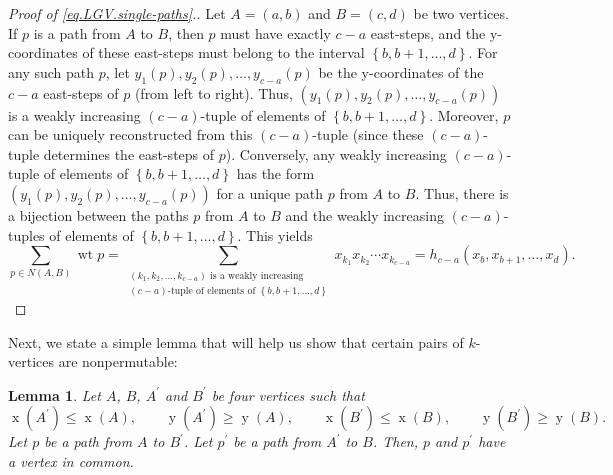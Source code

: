 \documentclass[reqno]{amsart}%
\newcommand{\0}{\phantom{c}}
\let\sumnonlimits\sum
\renewcommand{\sum}{\sumnonlimits\limits}
\theoremstyle{plain}
\newtheorem{lemma}[thm]{Lemma}
\theoremstyle{definition}
\numberwithin{equation}{section}
\begin{document}
\begin{proof}
[Proof of \eqref{eq.LGV.single-paths}.]Let $A=\left(  a,b\right)  $ and
$B=\left(  c,d\right)  $ be two vertices. If $p$ is a path from $A$ to $B$,
then $p$ must have exactly $c-a$ east-steps, and the y-coordinates of these
east-steps must belong to the interval $\left\{  b,b+1,\ldots,d\right\}  $.
For any such path $p$, let $y_{1}\left(  p\right)  ,y_{2}\left(  p\right)
,\ldots,y_{c-a}\left(  p\right)  $ be the y-coordinates of the $c-a$
east-steps of $p$ (from left to right). Thus, $\left(  y_{1}\left(  p\right)
,y_{2}\left(  p\right)  ,\ldots,y_{c-a}\left(  p\right)  \right)  $ is a
weakly increasing $\left(  c-a\right)  $-tuple of elements of $\left\{
b,b+1,\ldots,d\right\}  $. Moreover, $p$ can be uniquely reconstructed from
this $\left(  c-a\right)  $-tuple (since these $\left(  c-a\right)  $-tuple
determines the east-steps of $p$). Conversely, any weakly increasing $\left(
c-a\right)  $-tuple of elements of $\left\{  b,b+1,\ldots,d\right\}  $ has the
form $\left(  y_{1}\left(  p\right)  ,y_{2}\left(  p\right)  ,\ldots
,y_{c-a}\left(  p\right)  \right)  $ for a unique path $p$ from $A$ to $B$.
Thus, there is a bijection between the paths $p$ from $A$ to $B$ and the
weakly increasing $\left(  c-a\right)  $-tuples of elements of $\left\{
b,b+1,\ldots,d\right\}  $. This yields
\[
\sum_{p\in N\left(  A,B\right)  }\operatorname*{wt}p=\sum_{\substack{\left(
k_{1},k_{2},\ldots,k_{c-a}\right)  \text{ is a weakly increasing}\\\left(
c-a\right)  \text{-tuple of elements of }\left\{  b,b+1,\ldots,d\right\}
}}x_{k_{1}}x_{k_{2}}\cdots x_{k_{c-a}}=h_{c-a}\left(  x_{b},x_{b+1}%
,\ldots,x_{d}\right)  .
\]

\end{proof}

Next, we state a simple lemma that will help us show that certain pairs of
$k$-vertices are nonpermutable:

\begin{lemma}
\label{lem.LGV.hex}Let $A$, $B$, $A^{\prime}$ and $B^{\prime}$ be four
vertices such that%
\[
\operatorname*{x}\left(  A^{\prime}\right)  \leq\operatorname*{x}\left(
A\right)  ,\qquad\operatorname*{y}\left(  A^{\prime}\right)  \geq
\operatorname*{y}\left(  A\right)  ,\qquad\operatorname*{x}\left(  B^{\prime
}\right)  \leq\operatorname*{x}\left(  B\right)  ,\qquad\operatorname*{y}%
\left(  B^{\prime}\right)  \geq\operatorname*{y}\left(  B\right)  .
\]
Let $p$ be a path from $A$ to $B^{\prime}$. Let $p^{\prime}$ be a path from
$A^{\prime}$ to $B$. Then, $p$ and $p^{\prime}$ have a vertex in common.
\end{lemma}
\end{document}
